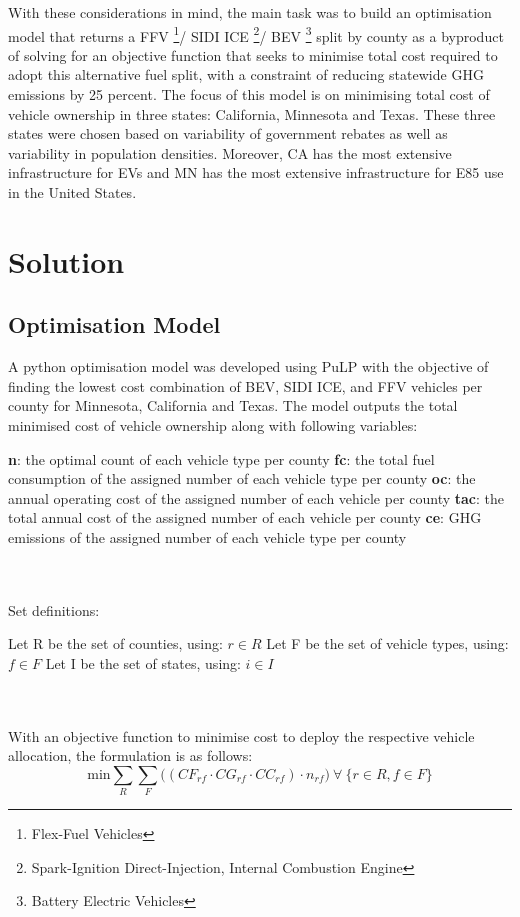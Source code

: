 \documentclass[answers]{exam}
\begin{document}
With these considerations in mind, the main task was to build an optimisation model that returns a FFV \footnote{Flex-Fuel Vehicles}/ SIDI ICE \footnote{Spark-Ignition Direct-Injection, Internal Combustion Engine}/ BEV \footnote{Battery Electric Vehicles} split by county as a byproduct of solving for an objective function that seeks to minimise total cost required to adopt this alternative fuel split, with a constraint of reducing statewide GHG emissions by 25 percent. The focus of this model is on minimising total cost of vehicle ownership in three states: California, Minnesota and Texas. These three states were chosen based on variability of government rebates as well as variability in population densities. Moreover, CA has the most extensive infrastructure for EVs and MN has the most extensive infrastructure for E85 use in the United States.

\section{Solution}
\subsection{Optimisation Model}
A python optimisation model was developed using PuLP with the objective of finding the lowest cost combination of BEV, SIDI ICE, and FFV vehicles per county for Minnesota, California and Texas. The model outputs the total minimised cost of vehicle ownership along with following variables:
\begin{outline}
\2 \textbf{n}: the optimal count of each vehicle type per county
\2 \textbf{fc}: the total fuel consumption of the assigned number of each vehicle type per county
\2 \textbf{oc}: the annual operating cost of  the assigned number of each vehicle per county
\2 \textbf{tac}: the total annual cost of the assigned number of each vehicle per county
\2 \textbf{ce}: GHG emissions of the assigned number of each vehicle type per county 
\end{outline}
\\~\\
Set definitions:
\begin{outline}
\2 Let R be the set of counties, using: $r \in R$
\2Let F be the set of vehicle types, using: $f \in F$
\2 Let I be the set of states, using: $i \in I$
\end{outline}
\\~\\
With an objective function to minimise cost to deploy the respective vehicle allocation, the formulation is as follows:
$$\text{min} \sum_{R}\sum_{F}\Big((CF_{rf}\cdot CG_{rf} \cdot CC_{rf})\cdot n_{rf}\Big) \  \forall \ \{r \in R, f \in F\}$$
\end{document}
